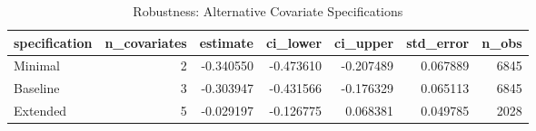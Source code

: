 \begin{table}
\caption{Robustness: Alternative Covariate Specifications}
\label{tab:robustness}
\begin{tabular}{lrrrrrr}
\toprule
specification & n_covariates & estimate & ci_lower & ci_upper & std_error & n_obs \\
\midrule
Minimal & 2 & -0.340550 & -0.473610 & -0.207489 & 0.067889 & 6845 \\
Baseline & 3 & -0.303947 & -0.431566 & -0.176329 & 0.065113 & 6845 \\
Extended & 5 & -0.029197 & -0.126775 & 0.068381 & 0.049785 & 2028 \\
\bottomrule
\end{tabular}
\end{table}
